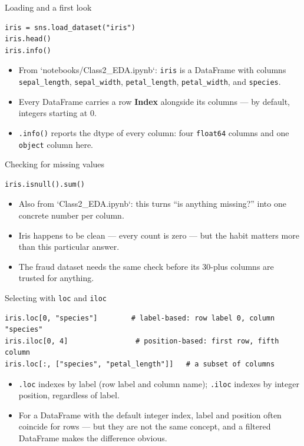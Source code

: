\begin{frame}[fragile]{Loading and a first look}
\begin{lstlisting}[style=coursepython]
iris = sns.load_dataset("iris")
iris.head()
iris.info()
\end{lstlisting}
\begin{itemize}
\item From `notebooks/Class2\_EDA.ipynb`: \texttt{iris} is a DataFrame with columns \texttt{sepal\_length}, \texttt{sepal\_width}, \texttt{petal\_length}, \texttt{petal\_width}, and \texttt{species}.
\item Every DataFrame carries a row \textbf{Index} alongside its columns --- by default, integers starting at 0.
\item \texttt{.info()} reports the dtype of every column: four \texttt{float64} columns and one \texttt{object} column here.
\end{itemize}
\coursefooter
\end{frame}

\begin{frame}[fragile]{Checking for missing values}
\begin{lstlisting}[style=coursepython]
iris.isnull().sum()
\end{lstlisting}
\begin{itemize}
\item Also from `Class2\_EDA.ipynb`: this turns ``is anything missing?'' into one concrete number per column.
\item Iris happens to be clean --- every count is zero --- but the habit matters more than this particular answer.
\item The fraud dataset needs the same check before its 30-plus columns are trusted for anything.
\end{itemize}
\coursefooter
\end{frame}

\begin{frame}[fragile]{Selecting with \texttt{loc} and \texttt{iloc}}
\begin{lstlisting}[style=coursepython]
iris.loc[0, "species"]        # label-based: row label 0, column "species"
iris.iloc[0, 4]                # position-based: first row, fifth column
iris.loc[:, ["species", "petal_length"]]   # a subset of columns
\end{lstlisting}
\begin{itemize}
\item \texttt{.loc} indexes by label (row label and column name); \texttt{.iloc} indexes by integer position, regardless of label.
\item For a DataFrame with the default integer index, label and position often coincide for rows --- but they are not the same concept, and a filtered DataFrame makes the difference obvious.
\end{itemize}
\coursefooter
\end{frame}

